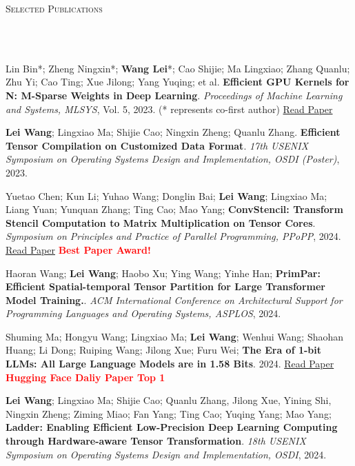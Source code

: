 \documentclass{article}
\newcommand{\header}[1]{{
\hspace*{-15pt}\vspace*{6pt} \textsc{#1}} \vspace*{-6pt} 
\lineunder
}
\newcommand{\lineunder}{
\vspace*{-8pt} \\ \hspace*{-18pt} 
\hrulefill \\
}
\renewcommand{\labelitemii}{
$\vcenter{\hbox{\tiny$\bullet$}}$\hspace*{-3pt}
}
\newcommand{\myhref}[2]{%
\href{#1}{\textcolor{ColorTwo}{#2}}
}
\newenvironment{bullet-list-major}{
\begin{list}{\labelitemii}{\setlength\leftmargin{3pt} 
\topsep 0pt \itemsep -2pt}}{\vspace*{4pt}\end{list}
}
\begin{document}
\vspace*{4pt}%
\header{Selected Publications}
    \begin{bullet-list-major}
    \item Lin Bin*; Zheng Ningxin*; \textbf{Wang Lei}*; Cao Shijie; Ma Lingxiao; Zhang Quanlu; Zhu Yi; Cao Ting; Xue Jilong; Yang Yuqing; et al. \textbf{Efficient GPU Kernels for N: M-Sparse Weights in Deep Learning}. \textit{Proceedings of Machine Learning and Systems, MLSYS}, Vol. 5, 2023. (* represents co-first author) \hspace{2pt} \textcolor{ColorTwo}{\faLink}  \myhref{https://proceedings.mlsys.org/paper_files/paper/2023/file/4552cedd396a308320209f75f56a5ad5-Paper-mlsys2023.pdf}{Read Paper}
    \vspace{2pt}
    \item \textbf{Lei Wang}; Lingxiao Ma; Shijie Cao; Ningxin Zheng; Quanlu Zhang. \textbf{Efficient Tensor Compilation on Customized Data Format}. \textit{17th USENIX Symposium on Operating Systems Design and Implementation, OSDI (Poster)}, 2023.
    \vspace{2pt}
    \item Yuetao Chen; Kun Li; Yuhao Wang; Donglin Bai; \textbf{Lei Wang}; Lingxiao Ma; Liang Yuan; Yunquan Zhang; Ting Cao; Mao 
    Yang; \textbf{ConvStencil: Transform Stencil Computation to Matrix
                    Multiplication on Tensor Cores}. \textit{Symposium on Principles and Practice of Parallel Programming, PPoPP}, 2024. \textcolor{ColorTwo}{\faLink}  \myhref{https://www.likun.tech/pdf/PPOPP_24__ConvStencil_preprint.pdf}{Read Paper}\textbf{\textcolor{red}{Best Paper Award!}}
    \vspace{2pt}
    \item Haoran Wang; \textbf{Lei Wang}; Haobo Xu; Ying Wang; Yinhe Han; \textbf{PrimPar: Efficient Spatial-temporal Tensor Partition for Large Transformer Model Training.}. \textit{ACM International Conference on Architectural Support for Programming Languages and Operating Systems, ASPLOS}, 2024. \textcolor{ColorTwo}{\faLink}
    \vspace{2pt}
    
    \item Shuming Ma; Hongyu Wang; Lingxiao Ma; \textbf{Lei Wang}; Wenhui Wang; Shaohan Huang; Li Dong; Ruiping Wang; Jilong Xue; Furu Wei; \textbf{The Era of 1-bit LLMs: All Large Language Models are in 1.58 Bits}. 2024. \textcolor{ColorTwo}{\faLink}  \myhref{https://arxiv.org/pdf/2402.17764.pdf}{Read Paper} \textbf{\textcolor{red}{Hugging Face Daliy Paper Top 1}}
    
    \item \textbf{Lei Wang}; Lingxiao Ma; Shijie Cao; Quanlu Zhang, Jilong Xue, Yining Shi, Ningxin Zheng; Ziming Miao; Fan Yang; Ting Cao; Yuqing Yang; Mao Yang; \textbf{Ladder: Enabling Efficient Low-Precision Deep Learning Computing through Hardware-aware Tensor Transformation}. \textit{18th USENIX Symposium on Operating Systems Design and Implementation, OSDI}, 2024.
    \end{bullet-list-major}
\end{document}
